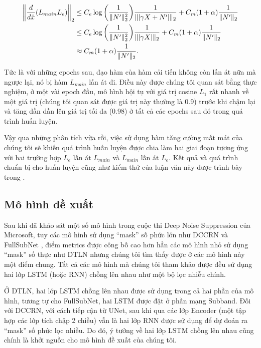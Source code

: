 					\begin{align*}
						\bigg \lVert \frac{d}{d \hat{x}} (L_{main} L_e) \bigg \rVert_2	& \le C_e \log \bigg( \frac{1}{\lVert N' \rVert^2_2} \bigg) \frac{1}{\lVert |\gamma X + N'| \rVert_2} + C_m (1 + \alpha) \frac{1}{\lVert N' \rVert_2} \\
								& \le C_e \log \bigg( \frac{1}{\lVert N' \rVert^2_2} \bigg) \frac{1}{\lVert |\gamma X| \rVert_2} + C_m (1 + \alpha) \frac{1}{\lVert N' \rVert_2} \\
								& \approx C_m (1 + \alpha) \frac{1}{\lVert N' \rVert_2}.
					\end{align*}
				
				Tức là với những epochs sau, đạo hàm của hàm cải tiến không còn lấn át nữa mà ngược lại, nó bị hàm $L_{main}$ lấn át đi. Điều này được chúng tôi quan sát bằng thực nghiệm, ở một vài epoch đầu, mô hình hội tụ với giá trị cosine $L_1$ rất nhanh về một giá trị (chúng tôi quan sát được giá trị này thường là 0.9) trước khi chậm lại và tăng dần dần lên giá trị tối đa (0.98) ở tất cả các epochs sau đó trong quá trình huấn luyện.
				
				Vậy qua những phân tích vừa rồi, việc sử dụng hàm tăng cường mất mát của chúng tôi sẽ khiến quá trình huấn luyện được chia làm hai giai đoạn tương ứng với hai trường hợp $L_e$ lấn át $L_{main}$ và $L_{main}$ lấn át $L_e$. Kết quả và quá trình chuẩn bị cho huấn luyện cũng như kiểm thử của luận văn này được trình bày trong .
				
	
	\subsection{Mô hình đề xuất}\label{subsection::relatedworks::proposed_model}
	
		Sau khi đã khảo sát một số mô hình trong cuộc thi Deep Noise Suppression \cite{dns} của Microsoft, tuy các mô hình sử dụng ``mask'' số phức lớn như DCCRN \cite{dccrn} và FullSubNet \cite{fullsubnet}, điểm metrics được công bố cao hơn hẳn các mô hình nhỏ sử dụng ``mask'' số thực như DTLN \cite{dtln} nhưng chúng tôi tìm thấy được ở các mô hình này một điểm chung. Tất cả các mô hình mà chúng tôi tham khảo được đều sử dụng hai lớp LSTM (hoặc RNN) chồng lên nhau như một bộ lọc nhiễu chính.
		
		Ở DTLN, hai lớp LSTM chồng lên nhau được sử dụng trong cả hai phần của mô hình, tương tự cho FullSubNet, hai LSTM được đặt ở phần mạng Subband. Đối với DCCRN, với cách tiếp cận từ UNet, sau khi qua các lớp Encoder (một tập hợp các lớp tích chập 2 chiều) vẫn là hai lớp RNN được sử dụng để dự đoán ra ``mask'' số phức lọc nhiễu. Do đó, ý tưởng về hai lớp LSTM chồng lên nhau cũng chính là khởi nguồn cho mô hình đề xuất của chúng tôi.
		
